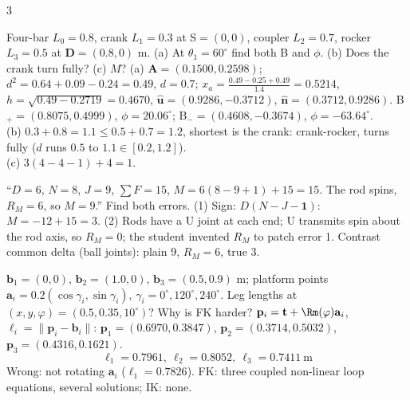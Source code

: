 \begin{multicols}{3}
\begin{examq}
Four-bar $L_0=0.8$, crank $L_1=0.3$ at {S}$=(0,0)$, coupler $L_2=0.7$, rocker $L_3=0.5$ at $\mathbf D=(0.8,0)$ m. (a) At $\theta_1=60^\circ$ find both B and $\phi$. (b) Does the crank turn fully? (c) $M$?
\solution
(a) $\mathbf A=(0.1500,0.2598)$; $d^2=0.64+0.09-0.24=0.49$, $d=0.7$; $x_a=\frac{0.49-0.25+0.49}{1.4}=0.5214$, $h=\sqrt{0.49-0.2719}=0.4670$, $\hat{\mathbf u}=(0.9286,-0.3712)$, $\hat{\mathbf n}=(0.3712,0.9286)$. B$_+=\boxed{(0.8075,0.4999)}$, $\phi=20.06^\circ$; B$_-=\boxed{(0.4608,-0.3674)}$, $\phi=-63.64^\circ$.\\
(b) $0.3+0.8=1.1\le0.5+0.7=1.2$, shortest is the crank: crank-rocker, turns fully ($d$ runs $0.5$ to $1.1\in[0.2,1.2]$).\\
(c) $3(4-4-1)+4=\boxed1$.
\end{examq}
\begin{examq}
``$D=6$, $N=8$, $J=9$, $\sum F=15$, $M=6(8-9+1)+15=15$. The rod spins, $R_M=6$, so $M=9$.'' Find both errors.
\solution
(1) Sign: $D(N-J-\mathbf1)$: $M=-12+15=\boxed3$. (2) Rods have a U joint at each end; U transmits spin about the rod axis, so $R_M=0$; the student invented $R_M$ to patch error 1. Contrast common delta (ball joints): plain 9, $R_M=6$, true 3.
\end{examq}
\begin{examq}
$\mathbf b_1=(0,0)$, $\mathbf b_2=(1.0,0)$, $\mathbf b_3=(0.5,0.9)$ m; platform points $\mathbf a_i=0.2(\cos\gamma_i,\sin\gamma_i)$, $\gamma_i=0^\circ,120^\circ,240^\circ$. Leg lengths at $(x,y,\varphi)=(0.5,0.35,10^\circ)$? Why is FK harder?
\solution
$\mathbf p_i=\mathbf t+\Rm(\varphi)\mathbf a_i$, $\ell_i=\lVert\mathbf p_i-\mathbf b_i\rVert$: $\mathbf p_1=(0.6970,0.3847)$, $\mathbf p_2=(0.3714,0.5032)$, $\mathbf p_3=(0.4316,0.1621)$.
\[\boxed{\ell_1=0.7961,\ \ell_2=0.8052,\ \ell_3=0.7411\ \text{m}}\]
Wrong: not rotating $\mathbf a_i$ ($\ell_1=0.7826$). FK: three coupled non-linear loop equations, several solutions; IK: none. \chk
\end{examq}
\end{multicols}
